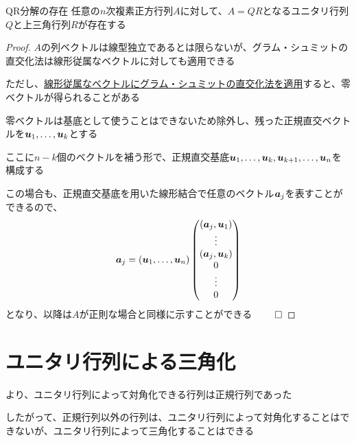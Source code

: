 \documentclass[../../../topic_linear-algebra]{subfiles}
\begin{document}
\begin{theorem*}{QR分解の存在}
  任意の$n$次複素正方行列$A$に対して、$A=QR$となるユニタリ行列$Q$と上三角行列$R$が存在する
\end{theorem*}

\begin{proof}
  $A$の列ベクトルは線型独立であるとは限らないが、グラム・シュミットの直交化法は線形従属なベクトルに対しても適用できる

  ただし、\hyperref[sec:gram-schmidt-with-dependent-vectors]{線形従属なベクトルにグラム・シュミットの直交化法を適用}すると、零ベクトルが得られることがある

  \br

  零ベクトルは基底として使うことはできないため除外し、残った正規直交ベクトルを$\vb*{u}_1,\ldots,\vb*{u}_k$とする

  ここに$n-k$個のベクトルを補う形で、正規直交基底$\vb*{u}_1,\ldots,\vb*{u}_k,\vb*{u}_{k+1},\ldots,\vb*{u}_n$を構成する

  \br

  この場合も、正規直交基底を用いた線形結合で任意のベクトル$\vb*{a}_j$を表すことができるので、
  \begin{equation*}
    \vb*{a}_j = (\vb*{u}_1,\ldots,\vb*{u}_n) \begin{pmatrix}
      (\vb*{a}_j, \vb*{u}_1) \\
      \vdots                 \\
      (\vb*{a}_j, \vb*{u}_k) \\
      0                      \\
      \vdots                 \\
      0
    \end{pmatrix}
  \end{equation*}
  となり、以降は$A$が正則な場合と同様に示すことができる $\qed$
\end{proof}

\sectionline
\section{ユニタリ行列による三角化}

より、ユニタリ行列によって対角化できる行列は正規行列であった

したがって、正規行列以外の行列は、ユニタリ行列によって対角化することはできないが、ユニタリ行列によって三角化することはできる
\end{document}
